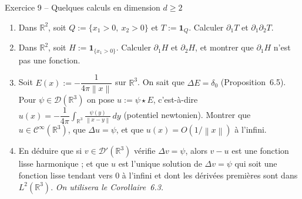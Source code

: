 \documentclass[11pt,a4paper]{article}
\newcommand{\R}{\mathbb{R}}
\newcommand{\norm}[1]{\left\|#1\right\|}
\newcommand{\Cinf}{\mathcal{C}^\infty}
\newcommand{\ie}{c'est-à-dire}
\newcommand{\D}{\mathcal{D}}
\theoremstyle{definition}
\begin{document}
\begin{exo}{Exercice 9 -- Quelques calculs en dimension $d\ge2$}
\begin{enumerate}[label=(\alph*)]
  \item Dans $\R^2$, soit $Q:=\{x_1>0,\ x_2>0\}$ et $T:=\mathbf 1_Q$. Calculer $\partial_1T$ et $\partial_1\partial_2T$.
  \item Dans $\R^2$, soit $H:=\mathbf 1_{\{x_1>0\}}$. Calculer $\partial_1H$ et $\partial_2H$, et montrer que $\partial_1H$ n'est pas une fonction.
  \item Soit $E(x):=-\dfrac1{4\pi\norm x}$ sur $\R^3$. On sait que $\Delta E=\delta_0$ (Proposition~6.5). Pour $\psi\in\D(\R^3)$ on pose $u:=\psi\star E$, \ie\ $u(x)=-\dfrac1{4\pi}\displaystyle\int_{\R^3}\frac{\psi(y)}{\norm{x-y}}\,dy$ (potentiel newtonien). Montrer que $u\in\Cinf(\R^3)$, que $\Delta u=\psi$, et que $u(x)=O(1/\norm x)$ à l'infini.
  \item En déduire que si $v\in\D'(\R^3)$ vérifie $\Delta v=\psi$, alors $v-u$ est une fonction lisse harmonique ; et que $u$ est l'unique solution de $\Delta v=\psi$ qui soit une fonction lisse tendant vers $0$ à l'infini et dont les dérivées premières sont dans $L^2(\R^3)$. \emph{On utilisera le Corollaire~6.3.}
\end{enumerate}
\end{exo}
\end{document}

